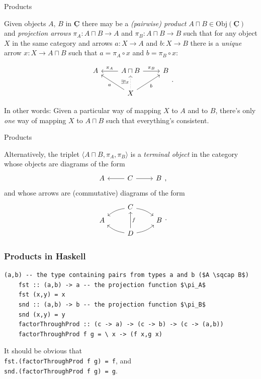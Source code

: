 \documentclass[10pt]{beamer}
\newcommand{\Cat}[1]{\ensuremath{\underline{\mathbf{#1}}}}
\newcommand{\Obj}[1]{\ensuremath{\mathrm{Obj}(\Cat{#1})}}
\theoremstyle{definition}
\theoremstyle{remark}
\numberwithin{equation}{section}
\begin{document}
\begin{frame}[fragile]{Products}

  Given objects $A$, $B$ in $\Cat{C}$ there may be a \emph{(pairwise) product}
  $A\sqcap B \in \Obj{C}$ and \emph{projection arrows} $\pi_A \colon A \sqcap B \rightarrow A$ and
  $\pi_B \colon A \sqcap B \rightarrow B$ such that for any object $X$ in the same category and arrows
  $a \colon X \rightarrow  A$ and $b \colon X \rightarrow B$
  there is a \emph{unique} arrow $x : X \rightarrow A \sqcap B$ such that $a = \pi_A \circ x$ and $b = \pi_B \circ x$:

  \[
  \begin{tikzcd}
    A & A\sqcap B \arrow[swap]{l}{\pi_{A}} \arrow{r}{\pi_{B}} & B \\
    & X \arrow[dotted]{u}{\exists! x} \arrow{ul}{a} \arrow[swap]{ur}{b} & 
  \end{tikzcd}\rlap{.}
  \]

  In other words: Given a particular way of mapping $X$ to $A$ and to $B$, there's only \emph{one} way of mapping $X$ to $A \sqcap B$ such that everything's consistent.

\end{frame}

\begin{frame}[fragile]{Products}

  Alternatively, the triplet $\langle {A \sqcap B, \pi_A, \pi_B} \rangle$ is a \emph{terminal object}
  in the category whose objects are diagrams of the form
  \[
    \begin{tikzcd}
      A & C \arrow{l} \arrow{r} & B
    \end{tikzcd}\rlap{,}
  \]
  and whose arrows are (commutative) diagrams of the form
  \[
    \begin{tikzcd}[row sep=tiny]
       & C \arrow[bend right=15]{dl} \arrow[bend left=15]{dr} & \\
      A & & B \\
       & D \arrow[bend left=15]{ul} \arrow[swap]{uu}{f} \arrow[bend right=15]{ur} & 
    \end{tikzcd}\rlap{.}
  \]

\end{frame}

\begin{frame}[fragile]
  \frametitle{Products in Haskell}
  \begin{lstlisting}[frame=single,mathescape=true]
    (a,b) -- the type containing pairs from types a and b ($A \sqcap B$)
    fst :: (a,b) -> a -- the projection function $\pi_A$
    fst (x,y) = x
    snd :: (a,b) -> b -- the projection function $\pi_B$
    snd (x,y) = y
    factorThroughProd :: (c -> a) -> (c -> b) -> (c -> (a,b))
    factorThroughProd f g = \ x -> (f x,g x)
  \end{lstlisting}

  It should be obvious that\\
  \lstinline{fst.(factorThroughProd f g) = f}, and\\
  \lstinline{snd.(factorThroughProd f g) = g}.
  
\end{frame}
\end{document}
